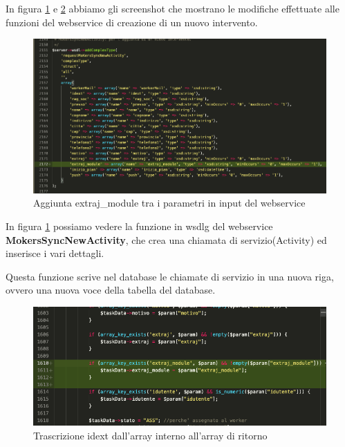 	In figura \ref{fig:5-4} e \ref{fig:5-5} abbiamo gli screenshot che mostrano le modifiche effettuate alle funzioni del webservice di creazione di un nuovo intervento.

\newspace
\begin{figure}[!h] 
	\centering
	\includegraphics[scale = 0.4]{immagini/webservices/ampliamenti/2ampl_prototipo_types.png}
	\caption{Aggiunta extraj\_module tra i parametri in input del webservice}
	\label{fig:5-4}
\end{figure}
\newspace

	In figura \ref{fig:5-4} possiamo vedere la funzione in \gls{wsdlg} del webservice \textbf{MokersSyncNewActivity}, che crea una chiamata di servizio(Activity) ed inserisce i vari dettagli. 
	
	Questa funzione scrive nel database le chiamate di servizio in una nuova riga, ovvero una nuova voce della tabella del database.


\newpage

\newspace
\begin{figure}[!h] 
	\centering
	\includegraphics[scale = 0.5]{immagini/webservices/ampliamenti/2ampl-insert-extraj_mokers__funzione-mokersNewActivity.png}
	\caption{Trascrizione idext dall'array interno all'array di ritorno}
	\label{fig:5-5}
\end{figure}
\newspace

